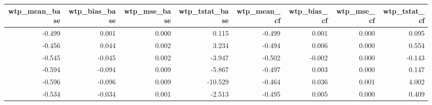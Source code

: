 \begin{tabular}{rrrrrrrr}
  \hline
wtp\_mean\_base & wtp\_bias\_base & wtp\_mse\_base & wtp\_tstat\_base & wtp\_mean\_cf & wtp\_bias\_cf & wtp\_mse\_cf & wtp\_tstat\_cf \\ 
  \hline
-0.499 & 0.001 & 0.000 & 0.115 & -0.499 & 0.001 & 0.000 & 0.095 \\ 
  -0.456 & 0.044 & 0.002 & 3.234 & -0.494 & 0.006 & 0.000 & 0.554 \\ 
  -0.545 & -0.045 & 0.002 & -3.947 & -0.502 & -0.002 & 0.000 & -0.143 \\ 
  -0.594 & -0.094 & 0.009 & -5.867 & -0.497 & 0.003 & 0.000 & 0.147 \\ 
  -0.596 & -0.096 & 0.009 & -10.529 & -0.464 & 0.036 & 0.001 & 4.002 \\ 
  -0.534 & -0.034 & 0.001 & -2.513 & -0.495 & 0.005 & 0.000 & 0.409 \\ 
   \hline
\end{tabular}

